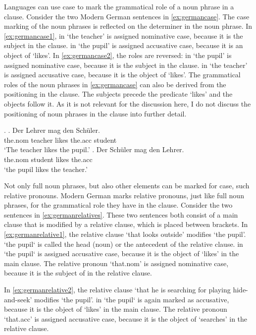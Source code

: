 Languages can use case to mark the grammatical role of a noun phrase in a clause. Consider the two Modern German sentences in \ref{ex:germancase}. The case marking of the noun phrases is reflected on the determiner in the noun phrase.
In \ref{ex:germancase1},  in  `the teacher' is assigned nominative case, because it is the subject in the clause.  in  `the pupil' is assigned accusative case, because it is an object of  `likes'.
In \ref{ex:germancase2}, the roles are reversed:  in  `the pupil' is assigned nominative case, because it is the subject in the clause.  in  `the teacher' is assigned accusative case, because it is the object of  `likes'.
The grammatical roles of the noun phrases in \ref{ex:germancase} can also be derived from the positioning in the clause. The subjects precede the predicate  `likes' and the objects follow it. As it is not relevant for the discussion here, I do not discuss the positioning of noun phrases in the clause into further detail.

\ex.\label{ex:germancase}
\ag. Der Lehrer mag den Schüler.\\
 the.\ac{nom} teacher likes the.\ac{acc} student\\
 `The teacher likes the pupil.'\label{ex:germancase1}
\bg. Der Schüler mag den Lehrer.\\
 the.\ac{nom} student likes the.\ac{acc}\\
 `the pupil likes the teacher.'\label{ex:germancase2}

Not only full noun phrases, but also other elements can be marked for case, such relative pronouns. Modern German marks relative pronouns, just like full noun phrases, for the grammatical role they have in the clause. Consider the two sentences in \ref{ex:germanrelatives}. These two sentences both consist of a main clause that is modified by a relative clause, which is placed between brackets.
In \ref{ex:germanrelative1}, the relative clause  `that looks outside' modifies  `the pupil'.  `the pupil` is called the head (noun) or the antecedent of the relative clause.  in  `the pupil` is assigned accusative case, because it is the object of  `likes' in the main clause. The relative pronoun  `that.\ac{nom}' is assigned nominative case, because it is the subject of in the relative clause.

In \ref{ex:germanrelative2}, the relative clause  `that he is searching for playing hide-and-seek' modifies  `the pupil'.  in  `the pupil` is again marked as accusative, because it is the object of  `likes' in the main clause. The relative pronoun  `that.\ac{acc}' is assigned accusative case, because it is the object of  `searches' in the relative clause.

